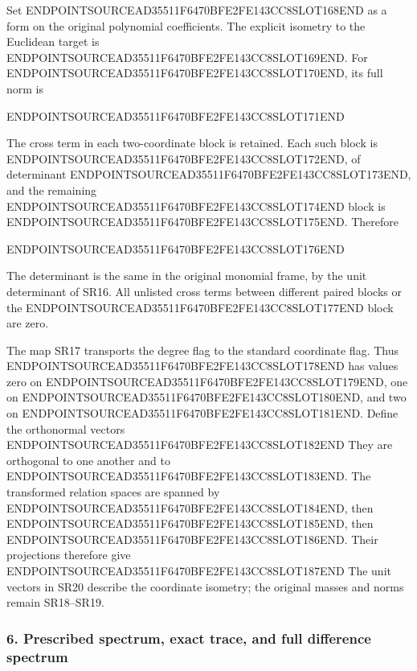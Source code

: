 Set ENDPOINTSOURCEAD35511F6470BFE2FE143CC8SLOT168END as a form on the original polynomial coefficients. The explicit isometry to the Euclidean target is ENDPOINTSOURCEAD35511F6470BFE2FE143CC8SLOT169END. For ENDPOINTSOURCEAD35511F6470BFE2FE143CC8SLOT170END, its full norm is

ENDPOINTSOURCEAD35511F6470BFE2FE143CC8SLOT171END

The cross term in each two-coordinate block is retained. Each such block is ENDPOINTSOURCEAD35511F6470BFE2FE143CC8SLOT172END, of determinant ENDPOINTSOURCEAD35511F6470BFE2FE143CC8SLOT173END, and the remaining ENDPOINTSOURCEAD35511F6470BFE2FE143CC8SLOT174END block is ENDPOINTSOURCEAD35511F6470BFE2FE143CC8SLOT175END. Therefore

ENDPOINTSOURCEAD35511F6470BFE2FE143CC8SLOT176END

The determinant is the same in the original monomial frame, by the unit determinant of SR16. All unlisted cross terms between different paired blocks or the ENDPOINTSOURCEAD35511F6470BFE2FE143CC8SLOT177END block are zero.

The map SR17 transports the degree flag to the standard coordinate flag. Thus ENDPOINTSOURCEAD35511F6470BFE2FE143CC8SLOT178END has values zero on ENDPOINTSOURCEAD35511F6470BFE2FE143CC8SLOT179END, one on ENDPOINTSOURCEAD35511F6470BFE2FE143CC8SLOT180END, and two on ENDPOINTSOURCEAD35511F6470BFE2FE143CC8SLOT181END. Define the orthonormal vectors ENDPOINTSOURCEAD35511F6470BFE2FE143CC8SLOT182END They are orthogonal to one another and to ENDPOINTSOURCEAD35511F6470BFE2FE143CC8SLOT183END. The transformed relation spaces are spanned by ENDPOINTSOURCEAD35511F6470BFE2FE143CC8SLOT184END, then ENDPOINTSOURCEAD35511F6470BFE2FE143CC8SLOT185END, then ENDPOINTSOURCEAD35511F6470BFE2FE143CC8SLOT186END. Their projections therefore give ENDPOINTSOURCEAD35511F6470BFE2FE143CC8SLOT187END The unit vectors in SR20 describe the coordinate isometry; the original masses and norms remain SR18--SR19.

\subsubsection{6. Prescribed spectrum, exact trace, and full difference spectrum}\label{endpoint-four_window_sharpness_review--prescribed-spectrum-exact-trace-and-full-difference-spectrum}

